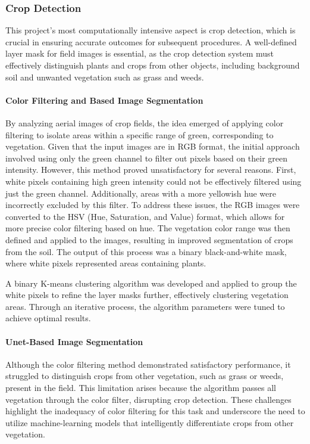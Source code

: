 \documentclass[conference]{IEEEtran}
\begin{document}
\subsubsection{Crop Detection}
This project's most computationally intensive aspect is crop detection, which is crucial in ensuring accurate outcomes for subsequent procedures. A well-defined layer mask for field images is essential, as the crop detection system must effectively distinguish plants and crops from other objects, including background soil and unwanted vegetation such as grass and weeds. 

\paragraph{Color Filtering and Based Image Segmentation}
By analyzing aerial images of crop fields, the idea emerged of applying color filtering to isolate areas within a specific range of green, corresponding to vegetation. Given that the input images are in RGB format, the initial approach involved using only the green channel to filter out pixels based on their green intensity. However, this method proved unsatisfactory for several reasons. First, white pixels containing high green intensity could not be effectively filtered using just the green channel. Additionally, areas with a more yellowish hue were incorrectly excluded by this filter. To address these issues, the RGB images were converted to the HSV (Hue, Saturation, and Value) format, which allows for more precise color filtering based on hue. The vegetation color range was then defined and applied to the images, resulting in improved segmentation of crops from the soil. The output of this process was a binary black-and-white mask, where white pixels represented areas containing plants.

A binary K-means clustering algorithm was developed and applied to group the white pixels to refine the layer masks further, effectively clustering vegetation areas. Through an iterative process, the algorithm parameters were tuned to achieve optimal results.

\paragraph{Unet-Based Image Segmentation}
Although the color filtering method demonstrated satisfactory performance, it struggled to distinguish crops from other vegetation, such as grass or weeds, present in the field. This limitation arises because the algorithm passes all vegetation through the color filter, disrupting crop detection. These challenges highlight the inadequacy of color filtering for this task and underscore the need to utilize machine-learning models that intelligently differentiate crops from other vegetation.
\end{document}
